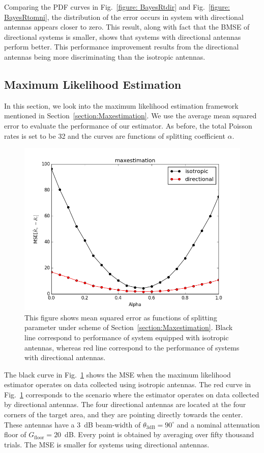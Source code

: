 Comparing the PDF curves in Fig.~\ref{figure: BayesRtdir} and Fig.~\ref{figure: BayesRtomni}, the distribution of the error occurs in system with directional antennas appears closer to zero.
This result, along with fact that the BMSE of directional systems is smaller, shows that systems with directional antennas perform better.
This performance improvement results from the directional antennas being more discriminating than the isotropic antennas. 


\subsection{Maximum Likelihood Estimation}

In this section, we look into the maximum likelihood estimation framework mentioned in Section~\ref{section:Maxestimation}.
We use the average mean squared error to evaluate the performance of our estimator.
As before, the total Poisson rates is set to be 32 and the curves are functions of splitting coefficient $\alpha$.
\begin{figure}[]
	\centering
	\includegraphics[scale=0.6]{Figures/MaxRt.png}
	\caption{This figure shows mean squared error as functions of splitting parameter under scheme of Section~\ref{section:Maxestimation}. Black line correspond to performance of system equipped with isotropic antennas, whereas red line correspond to the performance of systems with directional antennas. }
	\label{figure: MaxRt}
\end{figure}
The black curve in Fig.~\ref{figure: MaxRt} shows the MSE when the maximum likelihood estimator operates on data collected using isotropic antennas.
The red curve in Fig.~\ref{figure: MaxRt} corresponds to the scenario where the estimator operates on data collected by directional antennas.
The four directional antennas are located at the four corners of the target area, and they are pointing directly towards the center.
These antennas have a 3~dB beam-width of $\theta_{\mathrm{3dB}} = 90^{\circ}$ and a nominal attenuation floor of $G_{\mathrm{floor}} = 20$~dB.
Every point is obtained by averaging over fifty thousand trials.
The MSE is smaller for systems using directional antennas.


